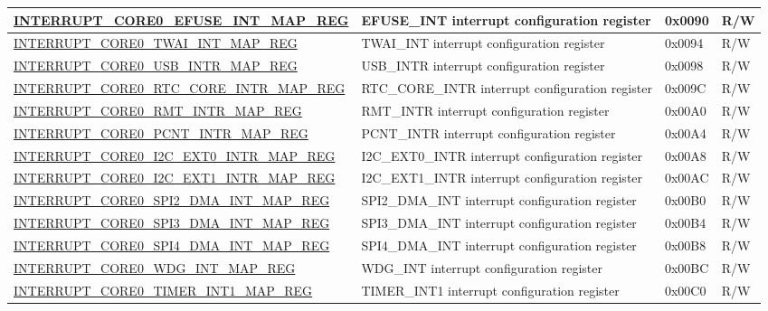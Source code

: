 \begin{landscape}
\begin{longtable}{ | p{10cm} | p{10.2cm} | p{1.3cm} | p{1cm} | }
\hyperref[regdesc:INTERRUPTCORE0EFUSEINTMAPREG]{INTERRUPT\_CORE0\_EFUSE\_INT\_MAP\_REG} & EFUSE\_INT interrupt configuration register & 0x0090 & R/W \\ \hline
\hyperref[regdesc:INTERRUPTCORE0TWAIINTMAPREG]{INTERRUPT\_CORE0\_TWAI\_INT\_MAP\_REG} & TWAI\_INT interrupt configuration register & 0x0094 & R/W \\ \hline
\hyperref[regdesc:INTERRUPTCORE0USBINTRMAPREG]{INTERRUPT\_CORE0\_USB\_INTR\_MAP\_REG} & USB\_INTR interrupt configuration register & 0x0098 & R/W \\ \hline
\hyperref[regdesc:INTERRUPTCORE0RTCCOREINTRMAPREG]{INTERRUPT\_CORE0\_RTC\_CORE\_INTR\_MAP\_REG} & RTC\_CORE\_INTR interrupt configuration register & 0x009C & R/W \\ \hline
\hyperref[regdesc:INTERRUPTCORE0RMTINTRMAPREG]{INTERRUPT\_CORE0\_RMT\_INTR\_MAP\_REG} & RMT\_INTR interrupt configuration register & 0x00A0 & R/W \\ \hline
\hyperref[regdesc:INTERRUPTCORE0PCNTINTRMAPREG]{INTERRUPT\_CORE0\_PCNT\_INTR\_MAP\_REG} & PCNT\_INTR interrupt configuration register & 0x00A4 & R/W \\ \hline
\hyperref[regdesc:INTERRUPTCORE0I2CEXT0INTRMAPREG]{INTERRUPT\_CORE0\_I2C\_EXT0\_INTR\_MAP\_REG} & I2C\_EXT0\_INTR interrupt configuration register & 0x00A8 & R/W \\ \hline
\hyperref[regdesc:INTERRUPTCORE0I2CEXT1INTRMAPREG]{INTERRUPT\_CORE0\_I2C\_EXT1\_INTR\_MAP\_REG} & I2C\_EXT1\_INTR interrupt configuration register & 0x00AC & R/W \\ \hline
\hyperref[regdesc:INTERRUPTCORE0SPI2DMAINTMAPREG]{INTERRUPT\_CORE0\_SPI2\_DMA\_INT\_MAP\_REG} & SPI2\_DMA\_INT interrupt configuration register & 0x00B0 & R/W \\ \hline
\hyperref[regdesc:INTERRUPTCORE0SPI3DMAINTMAPREG]{INTERRUPT\_CORE0\_SPI3\_DMA\_INT\_MAP\_REG} & SPI3\_DMA\_INT interrupt configuration register & 0x00B4 & R/W \\ \hline
\hyperref[regdesc:INTERRUPTCORE0SPI4DMAINTMAPREG]{INTERRUPT\_CORE0\_SPI4\_DMA\_INT\_MAP\_REG} & SPI4\_DMA\_INT interrupt configuration register & 0x00B8 & R/W \\ \hline
\hyperref[regdesc:INTERRUPTCORE0WDGINTMAPREG]{INTERRUPT\_CORE0\_WDG\_INT\_MAP\_REG} & WDG\_INT interrupt configuration register & 0x00BC & R/W \\ \hline
\hyperref[regdesc:INTERRUPTCORE0TIMERINT1MAPREG]{INTERRUPT\_CORE0\_TIMER\_INT1\_MAP\_REG} & TIMER\_INT1 interrupt configuration register & 0x00C0 & R/W \\ \hline

\end{longtable}
\end{landscape}
